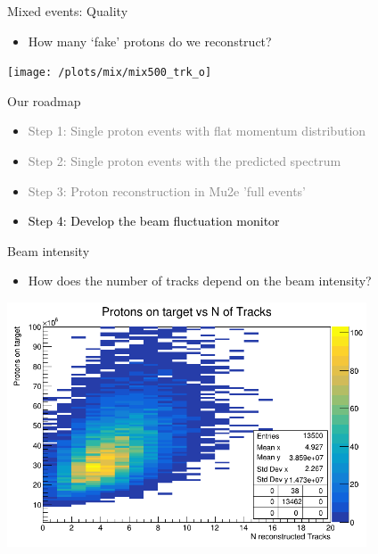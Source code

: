 \documentclass[10pt]{beamer}
\begin{document}
\begin{frame}{Mixed events: Quality}
\begin{itemize}
\item How many `fake' protons do we reconstruct? 
\end{itemize}
\centering
\texttt{[image: /plots/mix/mix500\_trk\_o]}
\end{frame}

\begin{frame}{Our roadmap}
\begin{itemize}
\setlength\itemsep{0.4cm}
\item \textcolor{gray}{Step 1: Single proton events with flat momentum distribution}
\item \textcolor{gray}{Step 2: Single proton events with the predicted spectrum}
\item \textcolor{gray}{Step 3: Proton reconstruction in Mu2e 'full events'}
\item \textcolor{black}{Step 4: Develop the beam fluctuation monitor}
\end{itemize}
\end{frame}

%
\begin{frame}{Beam intensity}
\begin{itemize}
\item How does the number of tracks depend on the beam intensity?
\end{itemize}
\begin{center}
\includegraphics[width=0.8\textwidth]{plots/mix/lum_vs_ntrk}
\end{center}
\end{frame}
\end{document}
